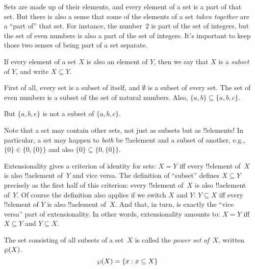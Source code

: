 \documentclass[../../../include/open-logic-section]{subfiles}
\begin{document}

\begin{explain}
Sets are made up of their elements, and every element of a set is a
part of that set. But there is also a sense that some of the elements
of a set \emph{taken together} are a ``part of'' that set. For
instance, the number~$2$ is part of the set of integers, but the set
of even numbers is also a part of the set of integers. It's important
to keep those two senses of being part of a set separate.
\end{explain}

\begin{defn}[Subset]
If every element of a set $X$ is also an element of
    $Y$, then we say that $X$ is a \emph{subset} of $Y$, and write $X
    \subseteq Y$.
\end{defn}

\begin{ex}
First of all, every set is a subset of itself, and $\emptyset$ is a
subset of every set. The set of even numbers is a subset of the set of
natural numbers. Also, $\{ a, b \} \subseteq \{ a, b, c \}$.

But $\{ a, b, e \}$ is not a subset of $\{ a, b, c \}$.
\end{ex}

\begin{explain}
Note that a set may contain other sets, not just as subsets but as
!!{element}s!{} In particular, a set may happen to \emph{both} be 
!!a{element} and a subset of another, e.g., $\{0\} \in \{0, \{0\}\}$
and also $\{0\} \subseteq \{0, \{0\}\}$.
\end{explain}

\begin{explain}
Extensionality gives a criterion of identity for sets: $X = Y$ iff
every !!{element} of~$X$ is also !!a{element} of~$Y$ and vice versa.
The definition of ``subset'' defines $X \subseteq Y$ precisely as the first
half of this criterion: every !!{element} of~$X$ is also !!a{element}
of~$Y$.  Of course the definition also applies if we switch $X$ and
$Y$: $Y \subseteq X$ iff every !!{element} of $Y$ is also !!a{element}
of~$X$.  And that, in turn, is exactly the ``vice versa'' part of
extensionality.  In other words, extensionality amounts to: $X = Y$
iff $X \subseteq Y$ and $Y \subseteq X$.
\end{explain}

\begin{defn}
The set consisting of all subsets of a set~$X$ is called the
\emph{power set of}~$X$, written $\wp(X)$.
    \[\wp(X) = \{ x : x \subseteq X \} \]
\end{defn}
\end{document}
